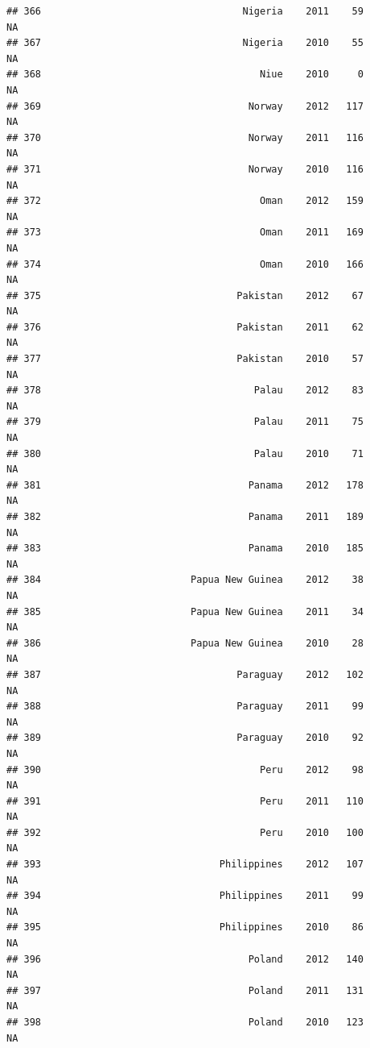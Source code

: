 \documentclass[
]{book}
\begin{document}
\begin{verbatim}
## 366                                   Nigeria    2011    59              NA
## 367                                   Nigeria    2010    55              NA
## 368                                      Niue    2010     0              NA
## 369                                    Norway    2012   117              NA
## 370                                    Norway    2011   116              NA
## 371                                    Norway    2010   116              NA
## 372                                      Oman    2012   159              NA
## 373                                      Oman    2011   169              NA
## 374                                      Oman    2010   166              NA
## 375                                  Pakistan    2012    67              NA
## 376                                  Pakistan    2011    62              NA
## 377                                  Pakistan    2010    57              NA
## 378                                     Palau    2012    83              NA
## 379                                     Palau    2011    75              NA
## 380                                     Palau    2010    71              NA
## 381                                    Panama    2012   178              NA
## 382                                    Panama    2011   189              NA
## 383                                    Panama    2010   185              NA
## 384                          Papua New Guinea    2012    38              NA
## 385                          Papua New Guinea    2011    34              NA
## 386                          Papua New Guinea    2010    28              NA
## 387                                  Paraguay    2012   102              NA
## 388                                  Paraguay    2011    99              NA
## 389                                  Paraguay    2010    92              NA
## 390                                      Peru    2012    98              NA
## 391                                      Peru    2011   110              NA
## 392                                      Peru    2010   100              NA
## 393                               Philippines    2012   107              NA
## 394                               Philippines    2011    99              NA
## 395                               Philippines    2010    86              NA
## 396                                    Poland    2012   140              NA
## 397                                    Poland    2011   131              NA
## 398                                    Poland    2010   123              NA

\end{verbatim}
\end{document}
